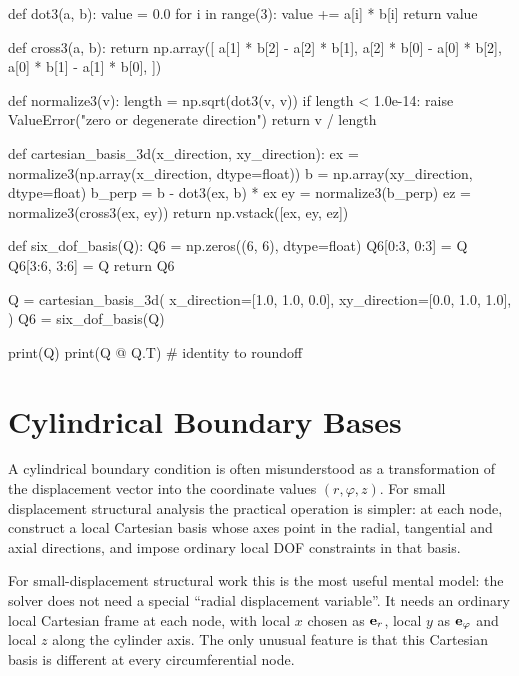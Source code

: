 \begin{python}
def dot3(a, b):
    value = 0.0
    for i in range(3):
        value += a[i] * b[i]
    return value


def cross3(a, b):
    return np.array([
        a[1] * b[2] - a[2] * b[1],
        a[2] * b[0] - a[0] * b[2],
        a[0] * b[1] - a[1] * b[0],
    ])


def normalize3(v):
    length = np.sqrt(dot3(v, v))
    if length < 1.0e-14:
        raise ValueError("zero or degenerate direction")
    return v / length


def cartesian_basis_3d(x_direction, xy_direction):
    ex = normalize3(np.array(x_direction, dtype=float))
    b = np.array(xy_direction, dtype=float)
    b_perp = b - dot3(ex, b) * ex
    ey = normalize3(b_perp)
    ez = normalize3(cross3(ex, ey))
    return np.vstack([ex, ey, ez])


def six_dof_basis(Q):
    Q6 = np.zeros((6, 6), dtype=float)
    Q6[0:3, 0:3] = Q
    Q6[3:6, 3:6] = Q
    return Q6


Q = cartesian_basis_3d(
    x_direction=[1.0, 1.0, 0.0],
    xy_direction=[0.0, 1.0, 1.0],
)
Q6 = six_dof_basis(Q)

print(Q)
print(Q @ Q.T)   # identity to roundoff
\end{python}

\section{Cylindrical Boundary Bases}

A cylindrical boundary condition is often misunderstood as a transformation of
the displacement vector into the coordinate values $(r,\varphi,z)$. For
small displacement structural analysis the practical operation is simpler: at
each node, construct a local Cartesian basis whose axes point in the radial,
tangential and axial directions, and impose ordinary local DOF constraints in
that basis.

\begin{notebooknote}
For small-displacement structural work this is the most useful mental model: the solver does not need a special ``radial displacement
variable''. It needs an ordinary local Cartesian frame at each node, with local
$x$ chosen as $\mathbf{e}_r$, local $y$ as $\mathbf{e}_{\varphi}$ and local $z$ along the
cylinder axis. The only unusual feature is that this Cartesian basis is different
at every circumferential node.
\end{notebooknote}

